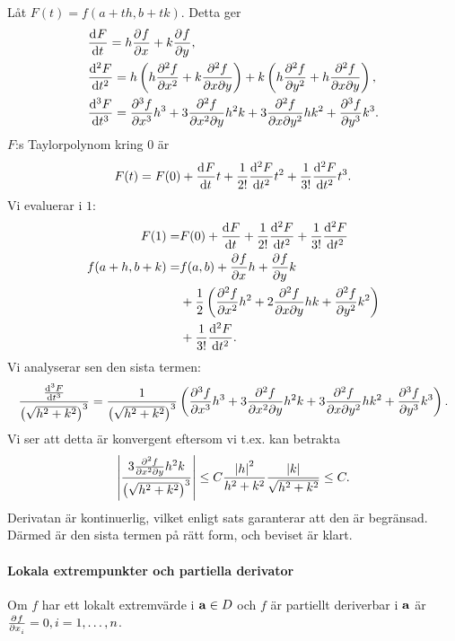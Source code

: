 \proof
Låt $F(t) = f(a + th, b + tk)$. Detta ger
\begin{align*}
	&\dv[]{F}{t} (t) = h\pdv[]{f}{x} (a + th, b + tk) + k\pdv[]{f}{y} (a + th, b + tk), \\
	&\dv[2]{F}{t} (t) = h\left(h\pdv[2]{f}{x} (a + th, b + tk) + k\pdv{f}{x}{y} (a, b)\right) + k\left(h\pdv[2]{f}{y} (a + th, b + tk) + h\pdv{f}{x}{y} (a, b)\right), \\
	&\dv[3]{F}{t} (t) = \pdv[3]{f}{x} (a, b)h^3 + 3\pdv{f}{x^2}{y} (a, b)h^2k + 3\pdv{f}{x}{y^2} (a, b)hk^2 + \pdv[3]{f}{y} (a, b)k^3.
\end{align*}
$F$:s Taylorpolynom kring $0$ är
\begin{align*}
	F(t) = F(0) + \dv[]{F}{t} (0)t + \frac{1}{2!}\dv[2]{F}{t} (0)t^2 + \frac{1}{3!}\dv[2]{F}{t} (\theta)t^3.
\end{align*}
Vi evaluerar i $1$:
\begin{align*}
	F(1)            =& F(0) + \dv[]{F}{t} (0) + \frac{1}{2!}\dv[2]{F}{t} (0) + \frac{1}{3!}\dv[2]{F}{t} (\theta) \\
	f(a + h, b + k) =& f(a, b) + \pdv[]{f}{x} (a, b)h + \pdv[]{f}{y} (a, b)k \\
	                 &+ \frac{1}{2}\left(\pdv[2]{f}{x} (a, b)h^2 + 2\pdv{f}{x}{y} (a, b)hk + \pdv[2]{f}{y} (a, b)k^2\right) \\
	                &+ \frac{1}{3!}\dv[2]{F}{t} (\theta).
\end{align*}
Vi analyserar sen den sista termen:
\begin{align*}
	\frac{\dv[3]{F}{t} (t)}{\left(\sqrt{h^2 + k^2}\right)^3} = \frac{1}{\left(\sqrt{h^2 + k^2}\right)^3}\left(\pdv[3]{f}{x} (a, b)h^3 + 3\pdv{f}{x^2}{y} (a, b)h^2k + 3\pdv{f}{x}{y^2} (a, b)hk^2 + \pdv[3]{f}{y} (a, b)k^3\right).
\end{align*}
Vi ser att detta är konvergent eftersom vi t.ex. kan betrakta
\begin{align*}
	\abs{\frac{3\pdv{f}{x^2}{y} (a, b)h^2k}{\left(\sqrt{h^2 + k^2}\right)^3}}\leq C\frac{\abs{h}^2}{h^2 + k^2}\frac{\abs{k}}{\sqrt{h^2 + k^2}}\leq C.
\end{align*}
Derivatan är kontinuerlig, vilket enligt sats garanterar att den är begränsad. Därmed är den sista termen på rätt form, och beviset är klart.

\paragraph{Lokala extrempunkter och partiella derivator}
Om $f$ har ett lokalt extremvärde i $\vect{a}\in D$ och $f$ är partiellt deriverbar i $\vect{a}$ är $\pdeval{f}{x_i}{\vect{a}} = 0, i = 1, \dots, n$.

